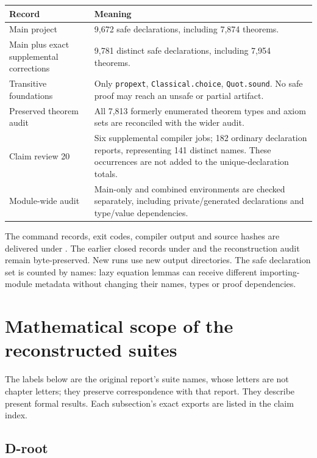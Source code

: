 \begin{longtable}{@{}p{}p{}@{}}
\toprule Record & Meaning\\\midrule\endhead
Main project & 9,672 safe declarations, including 7,874 theorems.\\
Main plus exact supplemental corrections & 9,781 distinct safe declarations, including 7,954 theorems.\\
Transitive foundations & Only \texttt{propext}, \texttt{Classical.choice}, \texttt{Quot.sound}. No safe proof may reach an unsafe or partial artifact.\\
Preserved theorem audit & All 7,813 formerly enumerated theorem types and axiom sets are reconciled with the wider audit.\\
Claim review 20 & Six supplemental compiler jobs; 182 ordinary declaration reports, representing 141 distinct names. These occurrences are not added to the unique-declaration totals.\\
Module-wide audit & Main-only and combined environments are checked separately, including private/generated declarations and type/value dependencies.\\
\bottomrule\end{longtable}

The command records, exit codes, compiler output and source hashes are delivered under . The earlier closed records under  and the reconstruction audit remain byte-preserved. New runs use new output directories. The safe declaration set is counted by names: lazy equation lemmas can receive different importing-module metadata without changing their names, types or proof dependencies.



\section{Mathematical scope of the reconstructed suites}\label{what-each-suite-actually-checks}

The labels below are the original report's suite names, whose letters are not chapter letters; they preserve correspondence with that report. They describe present formal results. Each subsection's exact exports are listed in the claim index.



\subsection{D-root}\label{d-root}

